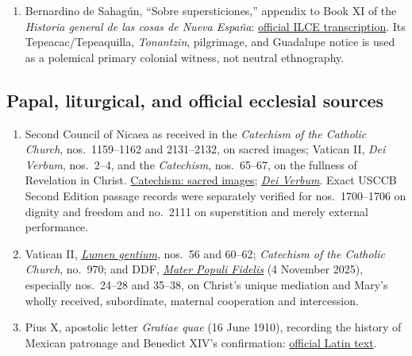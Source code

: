 \begin{enumerate}
  \item Bernardino de Sahagún, “Sobre supersticiones,” appendix to Book XI of the \emph{Historia general de las cosas de Nueva España}: \href{https://bibliotecadigital.ilce.edu.mx/sites/fondo2000/vol2/02/htm/sec_5.htm}{official ILCE transcription}. Its Tepeacac/Tepeaquilla, \emph{Tonantzin}, pilgrimage, and Guadalupe notice is used as a polemical primary colonial witness, not neutral ethnography.
\end{enumerate}

\subsection{Papal, liturgical, and official ecclesial sources}

\begin{enumerate}
  \item Second Council of Nicaea as received in the \emph{Catechism of the Catholic Church}, nos.~1159--1162 and 2131--2132, on sacred images; Vatican II, \emph{Dei Verbum}, nos.~2--4, and the \emph{Catechism}, nos.~65--67, on the fullness of Revelation in Christ. \href{https://www.vatican.va/content/catechism/en/part_two/section_one/chapter_two/article_1/iv_sacred_images.html}{Catechism: sacred images}; \href{https://www.vatican.va/archive/hist_councils/ii_vatican_council/documents/vat-ii_const_19651118_dei-verbum_en.html}{\emph{Dei Verbum}}. Exact USCCB Second Edition passage records were separately verified for nos.~1700--1706 on dignity and freedom and no.~2111 on superstition and merely external performance.

  \item Vatican II, \href{https://www.vatican.va/archive/hist_councils/ii_vatican_council/documents/vat-ii_const_19641121_lumen-gentium_en.html}{\emph{Lumen gentium}}, nos.~56 and 60--62; \emph{Catechism of the Catholic Church}, no.~970; and DDF, \href{https://www.vatican.va/roman_curia/congregations/cfaith/documents/rc_ddf_doc_20251104_mater-populi-fidelis_en.html}{\emph{Mater Populi Fidelis}} (4 November 2025), especially nos.~24--28 and 35--38, on Christ's unique mediation and Mary's wholly received, subordinate, maternal cooperation and intercession.

  \item Pius X, apostolic letter \emph{Gratiae quae} (16 June 1910), recording the history of Mexican patronage and Benedict XIV's confirmation: \href{https://www.vatican.va/content/pius-x/la/apost_letters/documents/hf_p-x_apl_19100616_gratiae-quae.html}{official Latin text}.


\end{enumerate}
